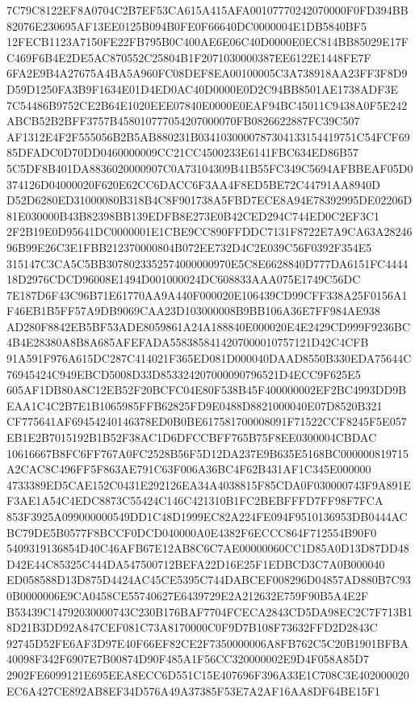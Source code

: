 \documentclass[UTF8,fontset=fandol,zihao=-4,a4paper]{ctexart}
\begin{document}
{{7C79C8122EF8A0704C2B7EF53CA615A415AFA00107770242070000F0FD394BB82076E230695AF13EE0125B094B0FE0F66640DC0000004E1DB5840BF5
12FECB1123A7150FE22FB795B0C400AE6E06C40D0000E0EC814BB85029E17FC469F6B4E2DE5AC870552C25804B1F2071030000387EE6122E1448FE7F
6FA2E9B4A27675A4BA5A960FC08DEF8EA00100005C3A738918AA23FF3F8D9D59D1250FA3B9F1634E01D4ED0AC40D0000E0D2C94BB8501AE1738ADF3E
7C54486B9752CE2B64E1020EEE07840E0000E0EAF94BC45011C9438A0F5E242ABCB52B2BFF3757B458010777054207000070FB0826622887FC39C507
AF1312E4F2F555056B2B5AB880231B0341030000787304133154419751C54FCF6985DFADC0D70DD0460000009CC21CC4500233E6141FBC634ED86B57
5C5DF8B401DA8836020000907C0A73104309B41B55FC349C5694AFBBEAF05D0374126D04000020F620E62CC6DACC6F3AA4F8ED5BE72C44791AA8940D
D52D6280ED31000080B318B4C8F901738A5FBD7ECE8A94E78392995DE02206D81E030000B43B82398BB139EDFB8E273E0B42CED294C744ED0C2EF3C1
2F2B19E0D95641DC0000001E1CBE9CC890FFDDC7131F8722E7A9CA63A2824696B99E26C3E1FBB212370000804B072EE732D4C2E039C56F0392F354E5
315147C3CA5C5BB3078023352574000000970E5C8E6628840D777DA6151FC444418D2976CDCD96008E1494D001000024DC608833AAA075E1749C56DC
7E187D6F43C96B71E61770AA9A440F000020E106439CD99CFF338A25F0156A1F46EB1B5FF57A9DB9069CAA23D103000008B9BB106A36E7FF984AE938
AD280F8842EB5BF53ADE8059861A24A188840E000020E4E2429CD999F9236BC4B4E28380A8B8A685AFEFADA5583858414207000010757121D42C4CFB
91A591F976A615DC287C414021F365ED081D000040DAAD8550B330EDA75644C76945424C949EBCD5008D33D853324207000090796521D4ECC9F625E5
605AF1DB80A8C12EB52F20BCFC04E80F538B45F400000002EF2BC4993DD9BEAA1C4C2B7E1B1065985FFB62825FD9E0488D8821000040E07D8520B321
CF775641AF69454240146378ED0B0BE617581700008091F71522CCF8245F5E057EB1E2B7015192B1B52F38AC1D6DFCCBFF765B75F8EE0300004CBDAC
10616667B8FC6FF767A0FC2528B56F5D12DA237E9B635E5168BC000000819715A2CAC8C496FF5F863AE791C63F006A36BC4F62B431AF1C345E000000
4733389ED5CAE152C0431E292126EA34A4038815F85CDA0F030000743F9A891EF3AE1A54C4EDC8873C55424C146C421310B1FC2BEBFFFD7FF98F7FCA
853F3925A099000000549DD1C48D1999EC82A224FE094F9510136953DB0444ACBC79DE5B0577F8BCCF0DCD040000A0E4382F6ECCC864F712554B90F0
5409319136854D40C46AFB67E12AB8C6C7AE00000060CC1D85A0D13D87DD48D42E44C85325C444DA547500712BEFA22D16E25F1EDBCD3C7A0B000040
ED058588D13D875D4424AC45CE5395C744DABCEF008296D04857AD880B7C930B0000006E9CA0458CE55740627E6439729E2A212632E759F90B5A4E2F
B53439C14792030000743C230B176BAF7704FCECA2843CD5DA98EC2C7F713B18D21B3DD92A847CEF081C73A8170000C0F9D7B108F73632FFD2D2843C
92745D52FE6AF3D97E40F66EF82CE2F7350000006A8FB762C5C20B1901BFBA40098F342F6907E7B00874D90F485A1F56CC320000002E9D4F058A85D7
2902FE6099121E695EEA8ECC6D551C15E407696F396A33E1C708C3E402000020EC6A427CE892AB8EF34D576A49A37385F53E7A2AF16AA8DF64BE15F1
}}
\end{document}
